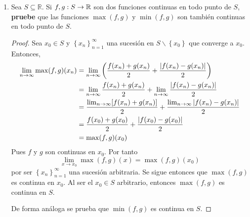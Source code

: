 \documentclass[12pt]{article}
\begin{document}
\begin{enumerate}
    \item Sea $S\subseteq\mathbb{R}$. Si $f,g:S\rightarrow\mathbb{R}$ son dos funciones continuas en todo punto de $S$, \textbf{pruebe} que las funciones $\max(f,g)$ y $\min(f,g)$ son también continuas en todo punto de $S$.

    \begin{proof}
        Sea $x_0\in S$ y $\left\{x_n \right\}_{ n=1}^\infty$ una sucesión en $S\backslash\left\{x_0 \right\}$ que converge a $x_0$. Entonces,
        \begin{equation*}
            \begin{split}
                \lim_{ n\rightarrow\infty}\max(f,g)(x_n)&=\lim_{ n\rightarrow\infty}\left(\frac{f(x_n)+g(x_n)}{2}+\frac{\left| f(x_n)-g(x_n) \right|}{2}\right)\\
                &=\lim_{ n\rightarrow\infty}\frac{f(x_n)+g(x_n)}{2}+\lim_{ n\rightarrow\infty}\frac{\left| f(x_n)-g(x_n) \right|}{2}\\
                &=\frac{\lim_{ n\rightarrow\infty}[f(x_n)+g(x_n)]}{2}+\frac{\lim_{ n\rightarrow\infty}\left| f(x_n)-g(x_n) \right|}{2}\\
                &=\frac{f(x_0)+g(x_0)}{2}+\frac{\left| f(x_0)-g(x_0) \right|}{2}\\
                &=\max(f,g)(x_0)
            \end{split}
        \end{equation*}
        Pues $f$ y $g$ son continuas en $x_0$. Por tanto
        \begin{equation*}
            \lim_{x\rightarrow x_0}\max(f,g)(x)=\max(f,g)(x_0)
        \end{equation*}
        por ser $\left\{x_n\right\}_{n=1}^\infty$ una sucesión arbitraria. Se sigue entonces que $\max(f,g)$ es continua en $x_0$. Al ser el $x_0\in S$ arbitrario, entonces $\max(f,g)$ es continua en $S$.

        De forma análoga se prueba que $\min(f,g)$ es continua en $S$.
    \end{proof}


\end{enumerate}
\end{document}
